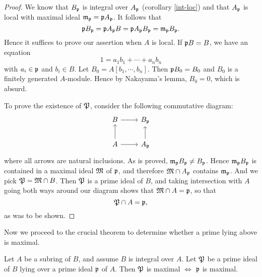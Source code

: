 			\begin{proof}
				We know that $B_\mathfrak{p}$ is integral over $A_\mathfrak{p}$ (corollary \ref{int-loc}) and that $A_\mathfrak{p}$ is local with maximal ideal $\mathfrak{m}_\mathfrak{p}=\mathfrak{p}A_\mathfrak{p}$. It follows that
				\[
				\mathfrak{p}B_\mathfrak{p}=\mathfrak{p}A_\mathfrak{p}B = \mathfrak{p}A_\mathfrak{p}B_\mathfrak{p}=\mathfrak{m}_\mathfrak{p}B_\mathfrak{p}.
				\]
				Hence it suffices to prove our assertion when $A$ is local. If $\mathfrak{p}B=B$, we have an equation
				\[
				1 = a_1b_1+\cdots+a_nb_n
				\]
				with $a_i \in \mathfrak{p}$ and $b_i \in B$. Let $B_0 = A[b_1,\cdots,b_n]$. Then $\mathfrak{p}B_0=B_0$ and $B_0$ is a finitely generated $A$-module. Hence by Nakayama's lemma, $B_0=0$, which is absurd.
				
				To prove the existence of $\mathfrak{P}$, consider the following commutative diagram:
				\[
				\begin{tikzcd}
					B \arrow[r]           & B_\mathfrak{p}           \\
					A \arrow[r] \arrow[u] & A_\mathfrak{p} \arrow[u]
				\end{tikzcd}
				\]
				where all arrows are natural inclusions. As is proved, $\mathfrak{m}_\mathfrak{p}B_\mathfrak{p} \ne B_\mathfrak{p}$. Hence $\mathfrak{m}_\mathfrak{p}B_\mathfrak{p}$ is contained in a maximal ideal $\mathfrak{M}$ of $\mathfrak{p}$, and therefore $\mathfrak{M} \cap A_\mathfrak{p}$ contains $\mathfrak{m}_\mathfrak{p}$. And we pick $\mathfrak{P}=\mathfrak{M} \cap B$. Then $\mathfrak{P}$ is a prime ideal of $B$, and taking intersection with $A$ going both ways around our diagram shows that $\mathfrak{M} \cap A = \mathfrak{p}$, so that
				\[
				\mathfrak{P} \cap A = \mathfrak{p},
				\]
				as was to be shown.
			\end{proof}
			
			Now we proceed to the crucial theorem to determine whether a prime lying above is maximal.
			
			\begin{theorem}\label{lie-above-maximal}
				Let $A$ be a subring of $B$, and assume $B$ is integral over $A$. Let $\mathfrak{P}$ be a prime ideal of $B$ lying over a prime ideal $\mathfrak{p}$ of $A$. Then $\mathfrak{P}$ is maximal $\iff$ $\mathfrak{p}$ is maximal.
			\end{theorem}
			
